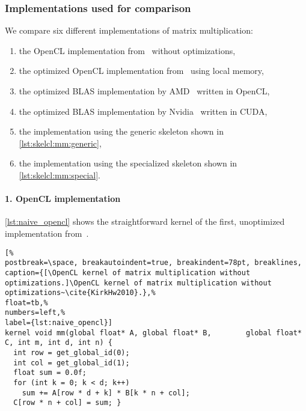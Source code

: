 \subsubsection*{Implementations used for comparison}
We compare six different implementations of matrix multiplication:
\begin{enumerate}
  \item the OpenCL implementation from~\cite{KirkHw2010} without optimizations,
  \item the optimized OpenCL implementation from~\cite{KirkHw2010} using \GPU local memory,
  \item the optimized BLAS implementation by AMD~\cite{APPML} written in OpenCL,
  \item the optimized BLAS implementation by Nvidia~\cite{cuBLAS} written in CUDA,
  \item the \SkelCL implementation using the generic \allpairs skeleton shown in \autoref{lst:skelcl:mm:generic},
  \item the \SkelCL implementation using the specialized \allpairs skeleton shown in \autoref{lst:skelcl:mm:special}.
\end{enumerate}

\paragraph{1. OpenCL implementation}
\autoref{lst:naive_opencl} shows the straightforward kernel of the first, unoptimized \OpenCL implementation from~\cite{KirkHw2010}.
\begin{lstlisting}[%                                                             
postbreak=\space, breakautoindent=true, breakindent=78pt, breaklines,
caption={[\OpenCL kernel of matrix multiplication without optimizations.]\OpenCL kernel of matrix multiplication without optimizations~\cite{KirkHw2010}.},%
float=tb,%
numbers=left,%
label={lst:naive_opencl}]
kernel void mm(global float* A, global float* B,        global float* C, int m, int d, int n) {
  int row = get_global_id(0);
  int col = get_global_id(1);
  float sum = 0.0f;
  for (int k = 0; k < d; k++)
    sum += A[row * d + k] * B[k * n + col];
  C[row * n + col] = sum; }
\end{lstlisting}

\vspace{-.5em}
